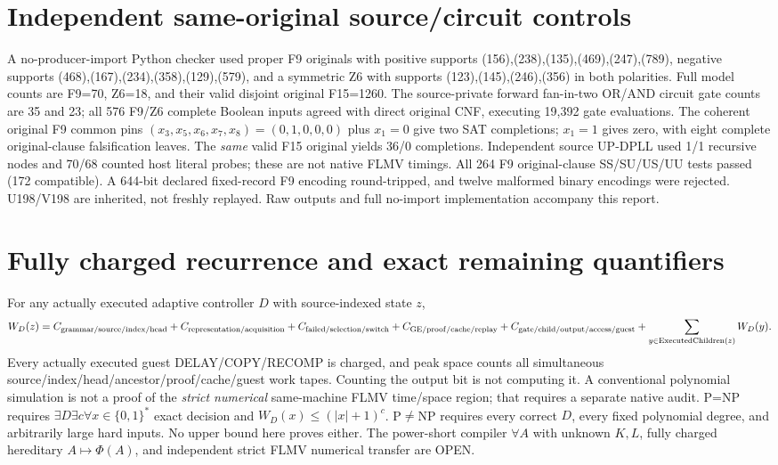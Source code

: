 \documentclass[11pt]{article}
\begin{document}
\section{Independent same-original source/circuit controls}
A no-producer-import Python checker used proper F9 originals with positive supports (156),(238),(135),(469),(247),(789), negative supports (468),(167),(234),(358),(129),(579), and a symmetric Z6 with supports (123),(145),(246),(356) in both polarities. Full model counts are F9=70, Z6=18, and their valid disjoint original F15=1260. The source-private forward fan-in-two OR/AND circuit gate counts are 35 and 23; all 576 F9/Z6 complete Boolean inputs agreed with direct original CNF, executing 19,392 gate evaluations.
The coherent original F9 common pins $(x_3,x_5,x_6,x_7,x_8)=(0,1,0,0,0)$ plus $x_1=0$ give two SAT completions; $x_1=1$ gives zero, with eight complete original-clause falsification leaves. The \emph{same} valid F15 original yields 36/0 completions. Independent source UP-DPLL used 1/1 recursive nodes and 70/68 counted host literal probes; these are not native FLMV timings. All 264 F9 original-clause SS/SU/US/UU tests passed (172 compatible). A 644-bit declared fixed-record F9 encoding round-tripped, and twelve malformed binary encodings were rejected. U198/V198 are inherited, not freshly replayed. Raw outputs and full no-import implementation accompany this report.
\section{Fully charged recurrence and exact remaining quantifiers}
For any actually executed adaptive controller $D$ with source-indexed state $z$,
\[
W_D(z)=C_{\rm grammar/source/index/head}+C_{\rm representation/acquisition}
+C_{\rm failed/selection/switch}+C_{\rm GE/proof/cache/replay}
+C_{\rm gate/child/output/access/guest}
+\sum_{y\in{\rm ExecutedChildren}(z)}W_D(y).
\]
Every actually executed guest DELAY/COPY/RECOMP is charged, and peak space counts all simultaneous source/index/head/ancestor/proof/cache/guest work tapes. Counting the output bit is not computing it. A conventional polynomial simulation is not a proof of the \emph{strict numerical} same-machine FLMV time/space region; that requires a separate native audit.
P=NP requires $\exists D\exists c\forall x\in\{0,1\}^*$ exact decision and $W_D(x)\le(|x|+1)^c$. P$\ne$NP requires every correct $D$, every fixed polynomial degree, and arbitrarily large hard inputs. No upper bound here proves either. The power-short compiler $\forall A$ with unknown $K,L$, fully charged hereditary $A\mapsto\Phi(A)$, and independent strict FLMV numerical transfer are OPEN.
\end{document}
